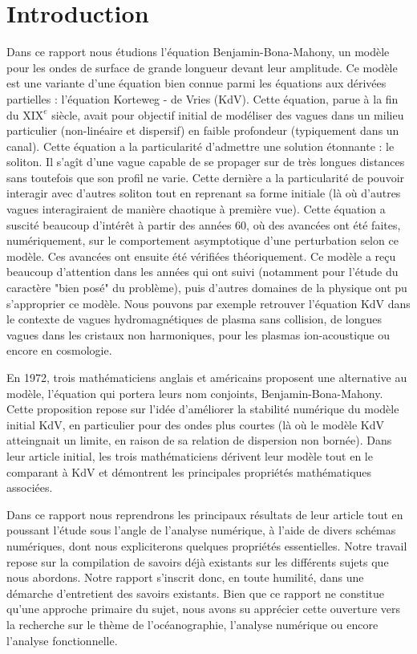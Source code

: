 \chapter*{Introduction}

Dans ce rapport nous étudions l'équation Benjamin-Bona-Mahony, un modèle 
pour les ondes de surface de grande longueur devant leur amplitude. Ce modèle est une variante 
d'une équation bien connue parmi les équations aux dérivées partielles : l'équation Korteweg - de Vries (KdV). Cette équation,
parue à la fin du $\text{XIX}^e$ siècle, avait pour objectif initial de modéliser des vagues dans un milieu 
particulier (non-linéaire et dispersif) en faible profondeur (typiquement dans un canal). Cette équation a la particularité
d'admettre une solution étonnante : le soliton. Il s'agît d'une vague capable de se propager sur de très longues distances sans toutefois que son
profil ne varie. Cette dernière a la particularité de pouvoir interagir avec d'autres soliton tout en 
reprenant sa forme initiale (là où d'autres vagues interagiraient de manière chaotique à première vue).
Cette équation a suscité beaucoup d'intérêt à partir des années 60, où des avancées ont été faites, numériquement, sur
le comportement asymptotique d'une perturbation selon ce modèle. Ces avancées ont ensuite été vérifiées théoriquement. 
Ce modèle a reçu beaucoup d'attention dans les années qui ont suivi (notamment pour l'étude du caractère "bien posé" du problème), puis 
d'autres domaines de la physique ont pu s'approprier ce modèle. Nous pouvons par exemple retrouver l'équation KdV dans le contexte de 
vagues hydromagnétiques de plasma sans collision, de longues vagues dans les cristaux non harmoniques, pour les plasmas ion-acoustique ou encore en cosmologie.

En 1972, trois mathématiciens anglais et américains proposent une alternative au modèle, l'équation qui portera leurs nom conjoints, Benjamin-Bona-Mahony. Cette proposition
repose sur l'idée d'améliorer la stabilité numérique du modèle initial KdV, en particulier pour des ondes plus courtes (là où le modèle KdV atteingnait un limite, en raison de sa relation de dispersion non bornée).
Dans leur article initial, les trois mathématiciens dérivent leur modèle tout en le comparant à KdV et démontrent les principales propriétés
mathématiques associées.

Dans ce rapport nous reprendrons les principaux résultats de leur article tout en poussant l'étude sous l'angle de l'analyse numérique, à l'aide de divers schémas numériques, dont nous expliciterons quelques propriétés essentielles.
Notre travail repose sur la compilation de savoirs déjà existants sur les différents sujets que nous abordons. Notre rapport s'inscrit donc, en toute humilité, dans une démarche d'entretient des savoirs
existants.
Bien que ce rapport ne constitue qu'une approche primaire du sujet, nous avons su apprécier cette ouverture vers la recherche sur le thème de l'océanographie, l'analyse numérique ou encore l'analyse fonctionnelle.

